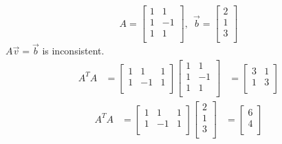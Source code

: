 \documentclass[
	date={October 9{,} 2024},
	month={10},
	day={9}
]{math486notes}
\begin{document}
\begin{example}
	\[ A = \left[ \begin{array}{cc}
		1 & 1\\
		1 & -1\\
		1 & 1\\
	\end{array} \right],\ \ \vec{b} = \left[ \begin{array}{c}
		2\\
		1\\
		3\\
	\end{array} \right] \]
	$A\vec{v}=\vec{b}$ is inconsistent.
	\begin{equation*}
	\begin{aligned}
		A^{T}A &= \left[ \begin{array}{ccc}
			1 & 1 & 1\\
			1 & -1 & 1\\
		\end{array} \right]\left[ \begin{array}{cc}
			1 & 1\\
			1 & -1\\
			1 & 1\\
	\end{array} \right]
		&= \left[ \begin{array}{cc}
			3 & 1\\
			1 & 3\\
		\end{array} \right]
	\end{aligned}
	\end{equation*}
	\begin{equation*}
	\begin{aligned}
		A^{T}A &= \left[ \begin{array}{ccc}
			1 & 1 & 1\\
			1 & -1 & 1\\
		\end{array} \right]\left[ \begin{array}{c}
			2\\
			1\\
			3\\
	\end{array} \right]
		&= \left[ \begin{array}{cc}
			6\\
			4\\
		\end{array} \right]
	\end{aligned}
	\end{equation*}

\end{example}
\end{document}
